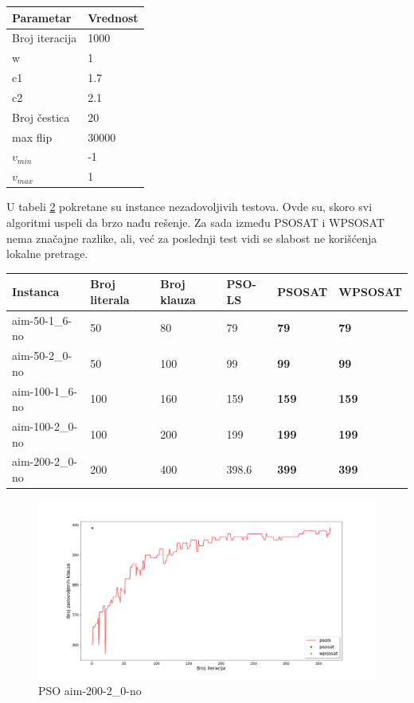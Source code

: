 \documentclass[a4paper]{article}
\begin{document}
\begin{table}[h!]
\centering
{}\label{tab:pso_parametri} 
\begin{tabular}{ |p{3cm}|p{2cm}| }
 \hline
 Parametar 	& Vrednost \\ 
 \hline
 Broj iteracija & 1000 \\
 w & 1 \\
 c1 & 1.7 \\
 c2 & 2.1 \\
 Broj čestica	& 20 \\
 max flip & 30000 \\
 $v_{min}$ & -1 \\
 $v_{max}$ & 1\\ 
 \hline
\end{tabular}
\end{table}

U tabeli \ref{tab:UNSAT} pokretane su instance nezadovoljivih testova. 
Ovde su, skoro svi algoritmi uspeli da brzo nađu rešenje. 
Za sada između PSOSAT i WPSOSAT nema značajne razlike, ali, već
za poslednji test vidi se slabost ne korišćenja lokalne pretrage.\\

\begin{table}[h!]
\centering
{}\label{tab:UNSAT}
\begin{tabular}{ |p{2.5cm}|p{1.4cm}|p{1.4cm}||p{1.6cm}|p{1.6cm}|p{1.6cm}| } 
\hline
 Instanca & Broj \break literala & Broj \break klauza & PSO-LS & PSOSAT & WPSOSAT \\ 
 \hline
 aim-50-1\_6-no & 50 & 80 & 79 & \textbf{79} & \textbf{79} \\ 
 aim-50-2\_0-no & 50 & 100 & 99 & \textbf{99} & \textbf{99} \\
 aim-100-1\_6-no & 100 & 160 & 159 & \textbf{159} & \textbf{159} \\
 aim-100-2\_0-no & 100 & 200 & 199 & \textbf{199} & \textbf{199} \\
 aim-200-2\_0-no & 200 & 400 & 398.6 & \textbf{399} & \textbf{399} \\
 \hline
\end{tabular}
\end{table}

\begin{figure}[h!]
\centering
\includegraphics[width=\textwidth]{pso-aim-200-2_0-no}
\caption{PSO aim-200-2\_0-no}\label{img:pso-200-2-no}
\end{figure}
\end{document}
